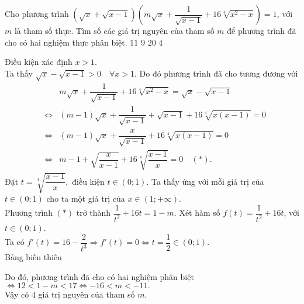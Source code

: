 \begin{ex}%
	Cho phương trình $\left( \sqrt{x}+\sqrt{x-1}\right)\left( m\sqrt{x}+\dfrac{1}{\sqrt{x-1}}+16 \sqrt[4]{x^2-x}\right)=1$, với $m$ là tham số thực. Tìm số các giá trị nguyên của tham số $m$ để phương trình đã cho có hai nghiệm thực phân biệt.
		\choice
	{$11$}
	{$9$}
	{$20$}
	{\True $4$}
	\loigiai
	{ Điều kiện xác định $x>1$.\\
		Ta thấy $\sqrt{x}-\sqrt{x-1}>0 \quad \forall x>1$. Do đó phương trình đã cho tương đương với
		\begin{eqnarray*}
		& & m\sqrt{x}+\dfrac{1}{\sqrt{x-1}}+16 \sqrt[4]{x^2-x} =\sqrt{x}-\sqrt{x-1}\\
		&\Leftrightarrow & (m-1)\sqrt{x}+\dfrac{1}{\sqrt{x-1}}+\sqrt{x-1}+16\sqrt[4]{x(x-1)}=0\\
		&\Leftrightarrow &(m-1)\sqrt{x}+\dfrac{x}{\sqrt{x-1}}+16\sqrt[4]{x(x-1)}=0\\
		&\Leftrightarrow &m-1+\sqrt{\dfrac{x}{x-1}}+16\sqrt[4]{\dfrac{x-1}{x}}=0 \quad (*).
		\end{eqnarray*}
		Đặt $t=\sqrt[4]{\dfrac{x-1}{x}},$ điều kiện $t\in (0;1)$. Ta thấy ứng với mỗi giá trị của $t\in (0;1)$ cho ta một giá trị của $x \in (1;+\infty)$. \\
		Phương trình $(*)$ trở thành $\dfrac{1}{t^2}+16t=1-m.$
		Xét hàm số $f(t)= \dfrac{1}{t^2}+16t$, với $t\in (0;1)$.\\
		Ta có $f'(t)=16-\dfrac{2}{t^3} \Rightarrow f'(t)=0 \Leftrightarrow
		 t= \dfrac{1}{2} \in (0;1).$\\
		 Bảng biến thiên 
		 \begin{center}
		 	{}
		 \end{center}
	 Do đó, phương trình đã cho có hai nghiệm phân biệt  $\Leftrightarrow 12<1-m<17 \Leftrightarrow -16<m<-11.$ \\
	 Vậy có $4$ giá trị nguyên của tham số $m$.
	}
\end{ex}


